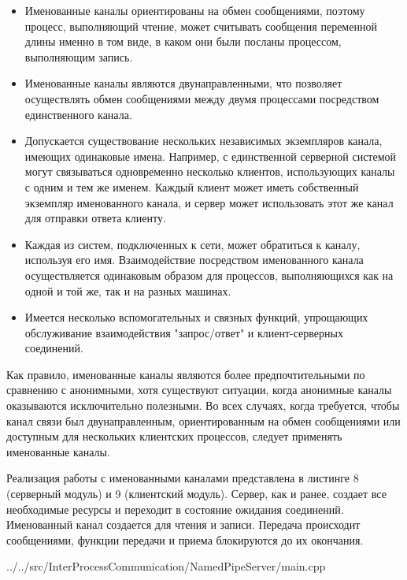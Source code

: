 \documentclass[a4paper, 12pt]{report}		%
\begin{document}
\begin{itemize}
\item Именованные каналы ориентированы на обмен сообщениями, поэтому процесс, выполняющий чтение, может считывать сообщения переменной длины именно в том виде, в каком они были посланы процессом, выполняющим запись.

\item Именованные каналы являются двунаправленными, что позволяет осуществлять обмен сообщениями между двумя процессами посредством единственного канала.

\item Допускается существование нескольких независимых экземпляров канала, имеющих одинаковые имена. Например, с единственной серверной системой могут связываться одновременно несколько клиентов, использующих каналы с одним и тем же именем. Каждый клиент может иметь собственный экземпляр именованного канала, и сервер может использовать этот же канал для отправки ответа клиенту.

\item Каждая из систем, подключенных к сети, может обратиться к каналу, используя его имя. Взаимодействие посредством именованного канала осуществляется одинаковым образом для процессов, выполняющихся как на одной и той же, так и на разных машинах.

\item Имеется несколько вспомогательных и связных функций, упрощающих обслуживание взаимодействия "запрос/ответ" и клиент-серверных соединений.
\end{itemize}

Как правило, именованные каналы являются более предпочтительными по сравнению с анонимными, хотя существуют ситуации, когда анонимные каналы оказываются исключительно полезными. Во всех случаях, когда требуется, чтобы канал связи был двунаправленным, ориентированным на обмен сообщениями или доступным для нескольких клиентских процессов, следует применять именованные каналы.

Реализация работы с именованными каналами представлена в листинге 8 (серверный модуль) и 9 (клиентский модуль). Сервер, как и ранее, создает все необходимые ресурсы и переходит в состояние ожидания соединений. Именованный канал создается для чтения и записи. Передача происходит сообщениями, функции передачи и приема блокируются до их окончания.


{../../src/InterProcessCommunication/NamedPipeServer/main.cpp}
\vspace{3em}
\end{document}
